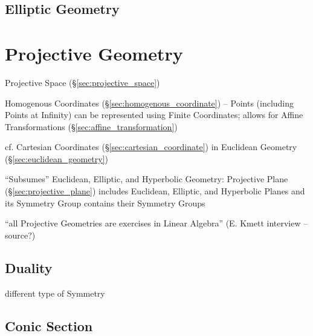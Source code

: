 \subsection{Elliptic Geometry}\label{sec:elliptic_geometry}



\section{Projective Geometry}\label{sec:projective_geometry}

Projective Space (\S\ref{sec:projective_space})

Homogenous Coordinates (\S\ref{sec:homogenous_coordinate}) -- Points
(including Points at Infinity) can be represented using Finite
Coordinates; allows for Affine Transformations
(\S\ref{sec:affine_transformation})

cf. Cartesian Coordinates (\S\ref{sec:cartesian_coordinate}) in
Euclidean Geometry (\S\ref{sec:euclidean_geometry})

``Subsumes'' Euclidean, Elliptic, and Hyperbolic Geometry: Projective
Plane (\S\ref{sec:projective_plane}) includes Euclidean, Elliptic, and
Hyperbolic Planes and its Symmetry Group contains their Symmetry
Groups

``all Projective Geometries are exercises in Linear Algebra'' (E.
Kmett interview -- source?) %



\subsection{Duality}\label{sec:projective_duality}

different type of Symmetry %



\subsection{Conic Section}\label{sec:conic_section}

